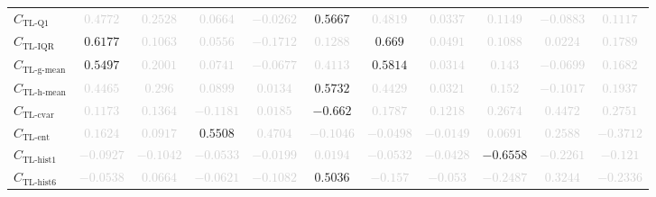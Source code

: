 \documentclass{standalone}
\newcommand{\tlqonename}{\text{TL-Q1}}
\newcommand{\tlqone}{C_{\tlqonename}}
\newcommand{\tliqrname}{\text{TL-IQR}}
\newcommand{\tliqr}{C_{\tliqrname}}
\newcommand{\tlgmeanname}{\text{TL-g-mean}}
\newcommand{\tlgmean}{C_{\tlgmeanname}}
\newcommand{\tlhmeanname}{\text{TL-h-mean}}
\newcommand{\tlhmean}{C_{\tlhmeanname}}
\newcommand{\tlcvariationname}{\text{TL-cvar}}
\newcommand{\tlcvariation}{C_{\tlcvariationname}}
\newcommand{\tlentropyname}{\text{TL-ent}}
\newcommand{\tlentropy}{C_{\tlentropyname}}
\newcommand{\tlhistonename}{\text{TL-hist1}}
\newcommand{\tlhistone}{C_{\tlhistonename}}
\newcommand{\tlhistsixname}{\text{TL-hist6}}
\newcommand{\tlhistsix}{C_{\tlhistsixname}}
\begin{document}
\begin{tabular}{lcccccccccc}
$\tlqone$ & \textcolor{lightgray}{$0.4772$} & \textcolor{lightgray}{$0.2528$} & \textcolor{lightgray}{$0.0664$} & \textcolor{lightgray}{$-0.0262$} & $0.5667$ & \textcolor{lightgray}{$0.4819$} & \textcolor{lightgray}{$0.0337$} & \textcolor{lightgray}{$0.1149$} & \textcolor{lightgray}{$-0.0883$} & \textcolor{lightgray}{$0.1117$} \\ 
$\tliqr$ & $0.6177$ & \textcolor{lightgray}{$0.1063$} & \textcolor{lightgray}{$0.0556$} & \textcolor{lightgray}{$-0.1712$} & \textcolor{lightgray}{$0.1288$} & $0.669$ & \textcolor{lightgray}{$0.0491$} & \textcolor{lightgray}{$0.1088$} & \textcolor{lightgray}{$0.0224$} & \textcolor{lightgray}{$0.1789$} \\ 
$\tlgmean$ & $0.5497$ & \textcolor{lightgray}{$0.2001$} & \textcolor{lightgray}{$0.0741$} & \textcolor{lightgray}{$-0.0677$} & \textcolor{lightgray}{$0.4113$} & $0.5814$ & \textcolor{lightgray}{$0.0314$} & \textcolor{lightgray}{$0.143$} & \textcolor{lightgray}{$-0.0699$} & \textcolor{lightgray}{$0.1682$} \\ 
$\tlhmean$ & \textcolor{lightgray}{$0.4465$} & \textcolor{lightgray}{$0.296$} & \textcolor{lightgray}{$0.0899$} & \textcolor{lightgray}{$0.0134$} & $0.5732$ & \textcolor{lightgray}{$0.4429$} & \textcolor{lightgray}{$0.0321$} & \textcolor{lightgray}{$0.152$} & \textcolor{lightgray}{$-0.1017$} & \textcolor{lightgray}{$0.1937$} \\ 
$\tlcvariation$ & \textcolor{lightgray}{$0.1173$} & \textcolor{lightgray}{$0.1364$} & \textcolor{lightgray}{$-0.1181$} & \textcolor{lightgray}{$0.0185$} & $-0.662$ & \textcolor{lightgray}{$0.1787$} & \textcolor{lightgray}{$0.1218$} & \textcolor{lightgray}{$0.2674$} & \textcolor{lightgray}{$0.4472$} & \textcolor{lightgray}{$0.2751$} \\ 
$\tlentropy$ & \textcolor{lightgray}{$0.1624$} & \textcolor{lightgray}{$0.0917$} & $0.5508$ & \textcolor{lightgray}{$0.4704$} & \textcolor{lightgray}{$-0.1046$} & \textcolor{lightgray}{$-0.0498$} & \textcolor{lightgray}{$-0.0149$} & \textcolor{lightgray}{$0.0691$} & \textcolor{lightgray}{$0.2588$} & \textcolor{lightgray}{$-0.3712$} \\ 
$\tlhistone$ & \textcolor{lightgray}{$-0.0927$} & \textcolor{lightgray}{$-0.1042$} & \textcolor{lightgray}{$-0.0533$} & \textcolor{lightgray}{$-0.0199$} & \textcolor{lightgray}{$0.0194$} & \textcolor{lightgray}{$-0.0532$} & \textcolor{lightgray}{$-0.0428$} & $-0.6558$ & \textcolor{lightgray}{$-0.2261$} & \textcolor{lightgray}{$-0.121$} \\ 
$\tlhistsix$ & \textcolor{lightgray}{$-0.0538$} & \textcolor{lightgray}{$0.0664$} & \textcolor{lightgray}{$-0.0621$} & \textcolor{lightgray}{$-0.1082$} & $0.5036$ & \textcolor{lightgray}{$-0.157$} & \textcolor{lightgray}{$-0.053$} & \textcolor{lightgray}{$-0.2487$} & \textcolor{lightgray}{$0.3244$} & \textcolor{lightgray}{$-0.2336$} \\ 

\end{tabular}
\end{document}
